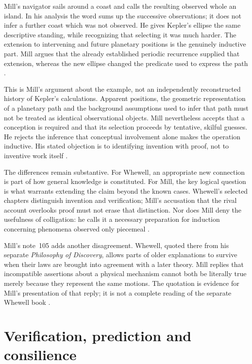 Mill's navigator sails around a coast and calls the resulting observed
whole an island. In his analysis the word sums up the successive
observations; it does not infer a further coast which was not observed.
He gives Kepler's ellipse the same descriptive standing, while
recognizing that selecting it was much harder. The extension to intervening
and future planetary positions is the genuinely inductive part.
Mill argues that the already established periodic recurrence supplied that
extension, whereas the new ellipse changed the predicate used to express
the path
\parencite[III.II.3 and 5]{Mill1882SystemLogicPG}.

This is Mill's argument about the example, not an independently
reconstructed history of Kepler's calculations. Apparent positions,
the geometric representation of a planetary path and the background
assumptions used to infer that path must not be treated as identical
observational objects.
Mill nevertheless accepts that a conception is required and that its
selection proceeds by tentative, skilful guesses. He rejects the inference
that conceptual involvement alone makes the operation inductive.
His stated objection is to identifying invention with proof, not to
inventive work itself
\parencite[III.II.3--5]{Mill1882SystemLogicPG}.

The differences remain substantive. For Whewell, an appropriate new
connection is part of how general knowledge is constituted. For Mill,
the key logical question is what warrants extending the claim beyond
the known cases. Whewell's selected chapters distinguish invention and
verification; Mill's accusation that the rival account overlooks proof
must not erase that distinction.
Nor does Mill deny the usefulness of colligation: he calls it a necessary
preparation for induction concerning phenomena observed only piecemeal
\parencite[II.V.3]{Whewell1858NovumPG}
\parencite[III.II.4--5]{Mill1882SystemLogicPG}.

Mill's note~105 adds another disagreement. Whewell, quoted there from
his separate \emph{Philosophy of Discovery}, allows parts of older
explanations to survive when their laws are brought into agreement with
a later theory. Mill replies that incompatible assertions about a
physical mechanism cannot both be literally true merely because they
represent the same motions. The quotation is evidence for Mill's
presentation of that reply; it is not a complete reading of the
separate Whewell book
\parencite[III.II, note~105]{Mill1882SystemLogicPG}.

\section{Verification, prediction and consilience}
\label{sec:p15-wm-consilience}

